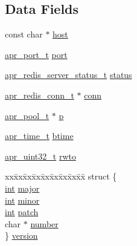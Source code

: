 \subsection*{Data Fields}
\begin{DoxyCompactItemize}
\item 
const char $\ast$ \hyperlink{structapr__redis__server__t_aa32b3c8c259dbfbeb884f477f89a19e0}{host}
\item 
\hyperlink{group__apr__network__io_gaa670a71960f6eb4fe0d0de2a1e7aba03}{apr\+\_\+port\+\_\+t} \hyperlink{structapr__redis__server__t_ad5f27ff6e223a5c7da341c0ab322407c}{port}
\item 
\hyperlink{group__APR__Util__RC_gaab66b126b216452bfae7e27f1ecdff8d}{apr\+\_\+redis\+\_\+server\+\_\+status\+\_\+t} \hyperlink{structapr__redis__server__t_a8566fd8aa341fa2a3b4acaa568b2a607}{status}
\item 
\hyperlink{structapr__redis__conn__t}{apr\+\_\+redis\+\_\+conn\+\_\+t} $\ast$ \hyperlink{structapr__redis__server__t_ac7c573f21a6ea3be51afdc8a7e99eb9b}{conn}
\item 
\hyperlink{structapr__pool__t}{apr\+\_\+pool\+\_\+t} $\ast$ \hyperlink{structapr__redis__server__t_a1116eaabd1c63611d61242b2c2d3f1f9}{p}
\item 
\hyperlink{group__apr__time_gadb4bde16055748190eae190c55aa02bb}{apr\+\_\+time\+\_\+t} \hyperlink{structapr__redis__server__t_a539d098b8653f4ab7aaa240aa22f0529}{btime}
\item 
\hyperlink{group__apr__platform_ga558548a135d8a816c4787250744ea147}{apr\+\_\+uint32\+\_\+t} \hyperlink{structapr__redis__server__t_a48b7193b08172986eab8494fcdc9d3a5}{rwto}
\item 
\begin{tabbing}
xx\=xx\=xx\=xx\=xx\=xx\=xx\=xx\=xx\=\kill
struct \{\\
\>\hyperlink{pcre_8txt_a42dfa4ff673c82d8efe7144098fbc198}{int} \hyperlink{structapr__redis__server__t_a67438d233c04367c487283aa65881f50}{major}\\
\>\hyperlink{pcre_8txt_a42dfa4ff673c82d8efe7144098fbc198}{int} \hyperlink{structapr__redis__server__t_a452865628796fc7f00f7481d019c31ec}{minor}\\
\>\hyperlink{pcre_8txt_a42dfa4ff673c82d8efe7144098fbc198}{int} \hyperlink{structapr__redis__server__t_aac160bdf064c798be3972f690a370bc6}{patch}\\
\>char $\ast$ \hyperlink{structapr__redis__server__t_a1c8e6446a52752d9b077a3fcbb37751b}{number}\\
\} \hyperlink{structapr__redis__server__t_a503a37eea23ac6da45bdccb95b664e60}{version}\\

\end{tabbing}\end{DoxyCompactItemize}


